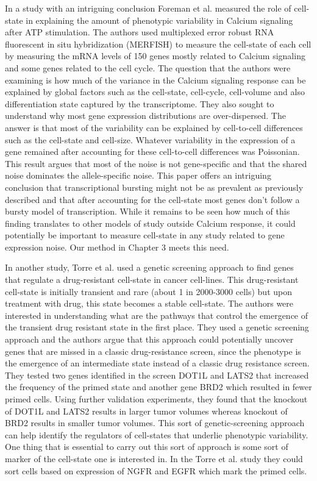 In a study with an intriguing conclusion Foreman et al. \cite{foreman_mammalian_2019} measured the role of cell-state in explaining the amount of phenotypic variability in Calcium signaling after ATP stimulation. The authors used multiplexed error robust RNA fluorescent in situ hybridization (MERFISH) to measure the cell-state of each cell by measuring the mRNA levels of 150 genes mostly related to Calcium signaling and some genes related to the cell cycle. The question that the authors were examining is how much of the variance in the Calcium signaling response can be explained by global factors such as the cell-state, cell-cycle, cell-volume and also differentiation state captured by the transcriptome. They also sought to understand why most gene expression distributions are over-dispersed. The answer is that most of the variability can be explained by cell-to-cell differences such as the cell-state and cell-size. Whatever variability in the expression of a gene remained after accounting for these cell-to-cell differences was Poissonian. This result argues that most of the noise is not gene-specific and that the shared noise dominates the allele-specific noise. This paper offers an intriguing conclusion that transcriptional bursting might not be as prevalent as previously described and that after accounting for the cell-state most genes don't follow a bursty model of transcription. While it remains to be seen how much of this finding translates to other models of study outside Calcium response, it could potentially be important to measure cell-state in any study related to gene expression noise. Our method in Chapter 3 meets this need.

In another study, Torre et al. \cite{torre2021ng} used a genetic screening approach to find genes that regulate a drug-resistant cell-state in cancer cell-lines. This drug-resistant cell-state is initially transient and rare (about 1 in 2000-3000 cells) but upon treatment with drug, this state becomes a stable cell-state.  The authors were interested in understanding what are the pathways that control the emergence of the transient drug resistant state in the first place. They used a genetic screening approach and the authors argue that this approach could potentially uncover genes that are missed in a classic drug-resistance screen, since the phenotype is the emergence of an intermediate state instead of a classic drug resistance screen. They tested two genes identified in the screen DOT1L and LATS2 that increased the frequency of the primed state and another gene BRD2 which resulted in fewer primed cells. Using further validation experiments, they found that the knockout of DOT1L and LATS2 results in larger tumor volumes whereas knockout of BRD2 results in smaller tumor volumes. This sort of genetic-screening approach can help identify the regulators of cell-states that underlie phenotypic variability. One thing that is essential to carry out this sort of approach is some sort of marker of the cell-state one is interested in. In the Torre et al. study they could sort cells based on expression of NGFR and EGFR which mark the primed cells.

